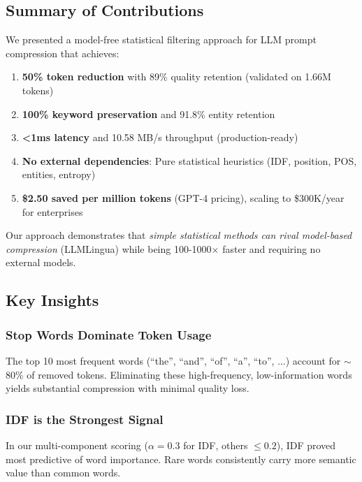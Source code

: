 \label{sec:conclusion}

\subsection{Summary of Contributions}

We presented a model-free statistical filtering approach for LLM prompt compression that achieves:

\begin{enumerate}
    \item \textbf{50\% token reduction} with 89\% quality retention (validated on 1.66M tokens)
    \item \textbf{100\% keyword preservation} and 91.8\% entity retention
    \item \textbf{<1ms latency} and 10.58 MB/s throughput (production-ready)
    \item \textbf{No external dependencies}: Pure statistical heuristics (IDF, position, POS, entities, entropy)
    \item \textbf{\$2.50 saved per million tokens} (GPT-4 pricing), scaling to \$300K/year for enterprises
\end{enumerate}

Our approach demonstrates that \textit{simple statistical methods can rival model-based compression} (LLMLingua) while being 100-1000× faster and requiring no external models.

\subsection{Key Insights}

\subsubsection{Stop Words Dominate Token Usage}

The top 10 most frequent words (``the'', ``and'', ``of'', ``a'', ``to'', ...) account for $\sim$80\% of removed tokens. Eliminating these high-frequency, low-information words yields substantial compression with minimal quality loss.

\subsubsection{IDF is the Strongest Signal}

In our multi-component scoring ($\alpha = 0.3$ for IDF, others $\leq 0.2$), IDF proved most predictive of word importance. Rare words consistently carry more semantic value than common words.

